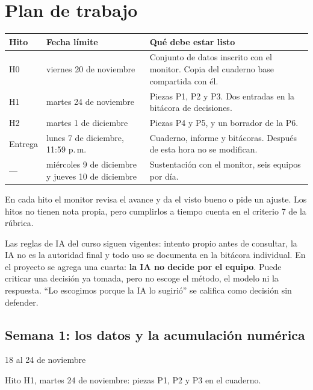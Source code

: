 \documentclass[12pt,letterpaper]{article}
\newcommand{\fechaHcero}{viernes 20 de noviembre}
\newcommand{\fechaHuno}{martes 24 de noviembre}
\newcommand{\fechaHdos}{martes 1 de diciembre}
\newcommand{\fechaEntrega}{lunes 7 de diciembre, 11:59 p.\,m.}
\newcommand{\fechaSustUno}{miércoles 9 de diciembre}
\newcommand{\fechaSustDos}{jueves 10 de diciembre}
\begin{document}
\section{Plan de trabajo}
\begin{center}
\begin{tabularx}{\textwidth}{L{1.3cm}L{3.9cm}Y}
\toprule
\textbf{Hito} & \textbf{Fecha límite} & \textbf{Qué debe estar listo}\\
\midrule
H0 & \fechaHcero & Conjunto de datos inscrito con el monitor. Copia del cuaderno base compartida con él.\\
H1 & \fechaHuno & Piezas P1, P2 y P3. Dos entradas en la bitácora de decisiones.\\
H2 & \fechaHdos & Piezas P4 y P5, y un borrador de la P6.\\
Entrega & \fechaEntrega & Cuaderno, informe y bitácoras. Después de esta hora no se modifican.\\
--- & \fechaSustUno{} y \fechaSustDos & Sustentación con el monitor, seis equipos por día.\\
\bottomrule
\end{tabularx}
\end{center}
En cada hito el monitor revisa el avance y da el visto bueno o pide un ajuste. Los hitos no tienen nota propia, pero cumplirlos a tiempo cuenta en el criterio 7 de la rúbrica.

Las reglas de IA del curso siguen vigentes: intento propio antes de consultar, la IA no es la autoridad final y todo uso se documenta en la bitácora individual. En el proyecto se agrega una cuarta: \textbf{la IA no decide por el equipo}. Puede criticar una decisión ya tomada, pero no escoge el método, el modelo ni la respuesta. ``Lo escogimos porque la IA lo sugirió'' se califica como decisión sin defender.

\subsection{Semana 1: los datos y la acumulación numérica}
{\large 18 al 24 de noviembre}

\begin{cajameta}
Hito H1, \fechaHuno: piezas P1, P2 y P3 en el cuaderno.
\end{cajameta}
\end{document}
